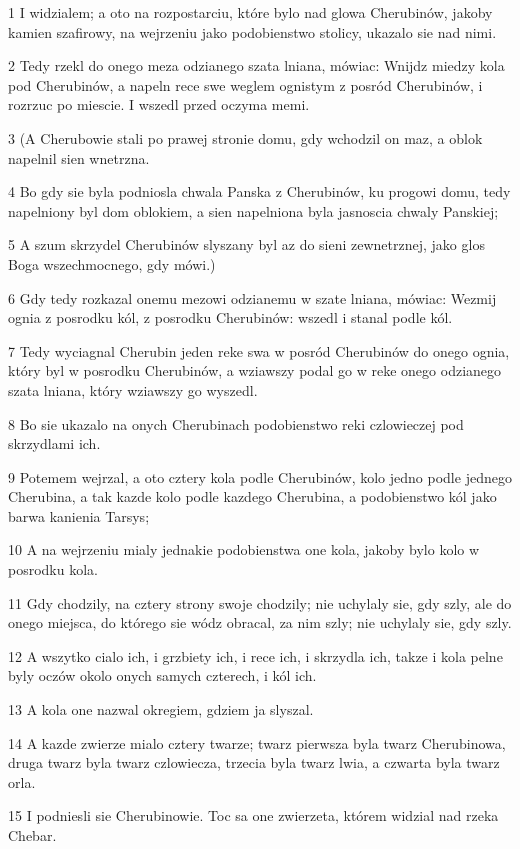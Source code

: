 \par 1 I widzialem; a oto na rozpostarciu, które bylo nad glowa Cherubinów, jakoby kamien szafirowy, na wejrzeniu jako podobienstwo stolicy, ukazalo sie nad nimi.
\par 2 Tedy rzekl do onego meza odzianego szata lniana, mówiac: Wnijdz miedzy kola pod Cherubinów, a napeln rece swe weglem ognistym z posród Cherubinów, i rozrzuc po miescie. I wszedl przed oczyma memi.
\par 3 (A Cherubowie stali po prawej stronie domu, gdy wchodzil on maz, a oblok napelnil sien wnetrzna.
\par 4 Bo gdy sie byla podniosla chwala Panska z Cherubinów, ku progowi domu, tedy napelniony byl dom oblokiem, a sien napelniona byla jasnoscia chwaly Panskiej;
\par 5 A szum skrzydel Cherubinów slyszany byl az do sieni zewnetrznej, jako glos Boga wszechmocnego, gdy mówi.)
\par 6 Gdy tedy rozkazal onemu mezowi odzianemu w szate lniana, mówiac: Wezmij ognia z posrodku kól, z posrodku Cherubinów: wszedl i stanal podle kól.
\par 7 Tedy wyciagnal Cherubin jeden reke swa w posród Cherubinów do onego ognia, który byl w posrodku Cherubinów, a wziawszy podal go w reke onego odzianego szata lniana, który wziawszy go wyszedl.
\par 8 Bo sie ukazalo na onych Cherubinach podobienstwo reki czlowieczej pod skrzydlami ich.
\par 9 Potemem wejrzal, a oto cztery kola podle Cherubinów, kolo jedno podle jednego Cherubina, a tak kazde kolo podle kazdego Cherubina, a podobienstwo kól jako barwa kanienia Tarsys;
\par 10 A na wejrzeniu mialy jednakie podobienstwa one kola, jakoby bylo kolo w posrodku kola.
\par 11 Gdy chodzily, na cztery strony swoje chodzily; nie uchylaly sie, gdy szly, ale do onego miejsca, do którego sie wódz obracal, za nim szly; nie uchylaly sie, gdy szly.
\par 12 A wszytko cialo ich, i grzbiety ich, i rece ich, i skrzydla ich, takze i kola pelne byly oczów okolo onych samych czterech, i kól ich.
\par 13 A kola one nazwal okregiem, gdziem ja slyszal.
\par 14 A kazde zwierze mialo cztery twarze; twarz pierwsza byla twarz Cherubinowa, druga twarz byla twarz czlowiecza, trzecia byla twarz lwia, a czwarta byla twarz orla.
\par 15 I podniesli sie Cherubinowie. Toc sa one zwierzeta, którem widzial nad rzeka Chebar.
